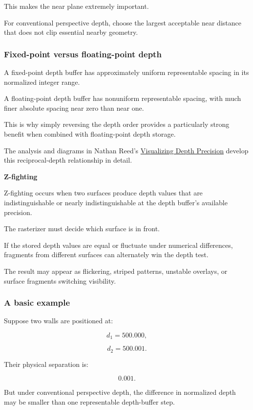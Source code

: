 This makes the near plane extremely important.

For conventional perspective depth, choose the largest acceptable near distance that does not clip essential nearby geometry.

\subsubsection{Fixed-point versus floating-point depth}\label{fixed-point-versus-floating-point-depth}

A fixed-point depth buffer has approximately uniform representable spacing in its normalized integer range.

A floating-point depth buffer has nonuniform representable spacing, with much finer absolute spacing near zero than near one.

This is why simply reversing the depth order provides a particularly strong benefit when combined with floating-point depth storage.

The analysis and diagrams in Nathan Reed's \href{https://developer.nvidia.com/blog/visualizing-depth-precision/?utm_source=chatgpt.com}{Visualizing Depth Precision} develop this reciprocal-depth relationship in detail. 

\textbf{Z-fighting}

Z-fighting occurs when two surfaces produce depth values that are indistinguishable or nearly indistinguishable at the depth buffer's available precision.

The rasterizer must decide which surface is in front.

If the stored depth values are equal or fluctuate under numerical differences, fragments from different surfaces can alternately win the depth test.

The result may appear as flickering, striped patterns, unstable overlays, or surface fragments switching visibility.

\subsubsection{A basic example}\label{a-basic-example}

Suppose two walls are positioned at:

\[
 d_1=500.000,
\]

\[
 d_2=500.001.
\]

Their physical separation is:

\[
 0.001.
\]

But under conventional perspective depth, the difference in normalized depth may be smaller than one representable depth-buffer step.

